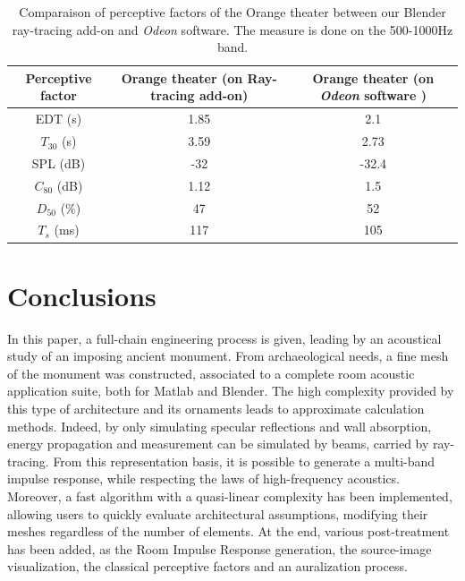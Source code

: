 \documentclass[AMA,STIX1COL]{WileyNJD-v2}
\begin{document}
\begin{table}[h]
\centering
 \begin{tabular}{| *{3}{c|}} 
 \hline 
 Perceptive factor & Orange theater (on Ray-tracing add-on) & Orange theater (on \textit{Odeon} software \cite{odeon})   \\ 
 \hline 
 \hline 
  EDT (s)& 1.85& 2.1 \\ 
 \hline 
$T_{30}$ (s)& 3.59&  2.73\\ 
 \hline 
SPL (dB) &-32 & -32.4\\ 
 \hline 
$C_{80}$ (dB)& 1.12&1.5  \\ 
 \hline 
$D_{50}$ (\%)&47 & 52 \\ 
 \hline 
$T_s$ (ms)&117 & 105 \\ 
 \hline 
\end{tabular} 
 \caption{Comparaison of perceptive factors of the Orange theater between our Blender ray-tracing add-on and \textit{Odeon} software. The measure is done on the 500-1000Hz band.}
 \label{tab_rindel} 
 \end{table}

\section{Conclusions}

In this paper, a full-chain engineering process is given, leading by an acoustical study of an imposing ancient monument. From archaeological needs, a fine mesh of the monument was constructed, associated to a complete room acoustic application suite, both for Matlab and Blender. The high complexity provided by this type of architecture and its ornaments leads to approximate calculation methods. Indeed, by only simulating specular reflections and wall absorption, energy propagation and measurement can be simulated by beams, carried by ray-tracing. From this representation basis, it is possible to generate a multi-band impulse response, while respecting the laws of high-frequency acoustics. Moreover, a fast algorithm with a quasi-linear complexity has been implemented, allowing users to quickly evaluate architectural assumptions, modifying their meshes regardless of the number of elements. At the end, various post-treatment has been added, as the Room Impulse Response generation, the source-image visualization, the classical perceptive factors and an auralization process.
\end{document}
